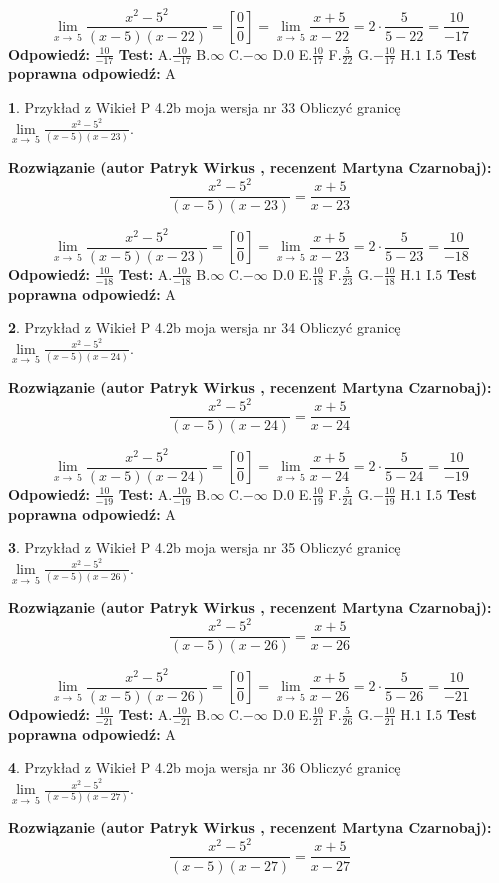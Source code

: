 \documentclass[12pt, a4paper]{article}
\theoremstyle{definition} %
\newtheorem{zad}{}
\newcommand{\zadStart}[1]{\begin{zad}#1\newline}
\newcommand{\zadStop}{\end{zad}}
\newcommand{\rozwStart}[2]{\noindent \textbf{Rozwiązanie (autor #1 , recenzent #2): }\newline}
\newcommand{\rozwStop}{\newline}
\newcommand{\odpStart}{\noindent \textbf{Odpowiedź:}\newline}
\newcommand{\odpStop}{\newline}
\newcommand{\testStart}{\noindent \textbf{Test:}\newline}
\newcommand{\testStop}{\newline}
\newcommand{\kluczStart}{\noindent \textbf{Test poprawna odpowiedź:}\newline}
\newcommand{\kluczStop}{\newline}
\begin{document}
$$\lim\limits_{x\to\ 5}\frac{x^{2}-5^{2}}{(x-5)(x-22)}=[\frac{0}{0}]=\lim\limits_{x\to\ 5}\frac{x+5}{x-22}=2 \cdot \frac{5}{5-22} = \frac{10}{-17}$$
\rozwStop
\odpStart
$\frac{10}{-17}$
\odpStop
\testStart
A.$\frac{10}{-17}$
B.$\infty$
C.$-\infty$
D.$0$
E.$\frac{10}{17}$
F.$\frac{5}{22}$
G.$-\frac{10}{17}$
H.$1$
I.$5$
\testStop
\kluczStart
A
\kluczStop



\zadStart{Przykład z Wikieł P 4.2b moja wersja nr 33}
Obliczyć granicę $\lim\limits_{x\to\ 5}\frac{x^{2}-5^{2}}{(x-5)(x-23)}$.
\zadStop
\rozwStart{Patryk Wirkus}{Martyna Czarnobaj}
$$\frac{x^{2}-5^{2}}{(x-5)(x-23)}=\frac{x+5}{x-23}$$

$$\lim\limits_{x\to\ 5}\frac{x^{2}-5^{2}}{(x-5)(x-23)}=[\frac{0}{0}]=\lim\limits_{x\to\ 5}\frac{x+5}{x-23}=2 \cdot \frac{5}{5-23} = \frac{10}{-18}$$
\rozwStop
\odpStart
$\frac{10}{-18}$
\odpStop
\testStart
A.$\frac{10}{-18}$
B.$\infty$
C.$-\infty$
D.$0$
E.$\frac{10}{18}$
F.$\frac{5}{23}$
G.$-\frac{10}{18}$
H.$1$
I.$5$
\testStop
\kluczStart
A
\kluczStop



\zadStart{Przykład z Wikieł P 4.2b moja wersja nr 34}
Obliczyć granicę $\lim\limits_{x\to\ 5}\frac{x^{2}-5^{2}}{(x-5)(x-24)}$.
\zadStop
\rozwStart{Patryk Wirkus}{Martyna Czarnobaj}
$$\frac{x^{2}-5^{2}}{(x-5)(x-24)}=\frac{x+5}{x-24}$$

$$\lim\limits_{x\to\ 5}\frac{x^{2}-5^{2}}{(x-5)(x-24)}=[\frac{0}{0}]=\lim\limits_{x\to\ 5}\frac{x+5}{x-24}=2 \cdot \frac{5}{5-24} = \frac{10}{-19}$$
\rozwStop
\odpStart
$\frac{10}{-19}$
\odpStop
\testStart
A.$\frac{10}{-19}$
B.$\infty$
C.$-\infty$
D.$0$
E.$\frac{10}{19}$
F.$\frac{5}{24}$
G.$-\frac{10}{19}$
H.$1$
I.$5$
\testStop
\kluczStart
A
\kluczStop



\zadStart{Przykład z Wikieł P 4.2b moja wersja nr 35}
Obliczyć granicę $\lim\limits_{x\to\ 5}\frac{x^{2}-5^{2}}{(x-5)(x-26)}$.
\zadStop
\rozwStart{Patryk Wirkus}{Martyna Czarnobaj}
$$\frac{x^{2}-5^{2}}{(x-5)(x-26)}=\frac{x+5}{x-26}$$

$$\lim\limits_{x\to\ 5}\frac{x^{2}-5^{2}}{(x-5)(x-26)}=[\frac{0}{0}]=\lim\limits_{x\to\ 5}\frac{x+5}{x-26}=2 \cdot \frac{5}{5-26} = \frac{10}{-21}$$
\rozwStop
\odpStart
$\frac{10}{-21}$
\odpStop
\testStart
A.$\frac{10}{-21}$
B.$\infty$
C.$-\infty$
D.$0$
E.$\frac{10}{21}$
F.$\frac{5}{26}$
G.$-\frac{10}{21}$
H.$1$
I.$5$
\testStop
\kluczStart
A
\kluczStop



\zadStart{Przykład z Wikieł P 4.2b moja wersja nr 36}
Obliczyć granicę $\lim\limits_{x\to\ 5}\frac{x^{2}-5^{2}}{(x-5)(x-27)}$.
\zadStop
\rozwStart{Patryk Wirkus}{Martyna Czarnobaj}
$$\frac{x^{2}-5^{2}}{(x-5)(x-27)}=\frac{x+5}{x-27}$$
\end{document}
